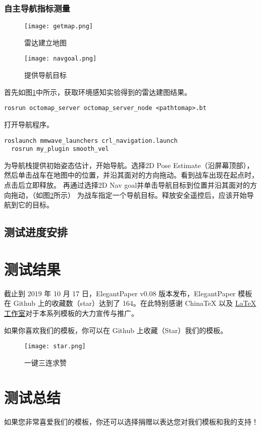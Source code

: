 \documentclass[lang=cn,11pt,a4paper]{elegantpaper}
\begin{document}
\subsubsection{自主导航指标测量}

\begin{figure}[htbp]
  \centering
  \texttt{[image: getmap.png]}
  \caption{雷达建立地图}
  \label{fig:getmap}
\end{figure}
\begin{figure}[htbp]
  \centering
  \texttt{[image: navgoal.png]}
  \caption{提供导航目标}
  \label{fig:goal}
\end{figure}


首先如图\ref{fig:getmap}中所示，获取环境感知实验得到的雷达建图结果。
\begin{lstlisting}[language=ros]
  rosrun octomap_server octomap_server_node <pathtomap>.bt
\end{lstlisting}	
打开导航程序。
\begin{lstlisting}[language=ros]
  roslaunch mmwave_launchers crl_navigation.launch
  rosrun my_plugin smooth_vel
\end{lstlisting}
为导航栈提供初始姿态估计，开始导航。选择2D Pose Estimate（沿屏幕顶部），
然后单击战车在地图中的位置，并沿其面对的方向拖动。看到战车出现在起点时，点击后立即释放。
再通过选择2D Nav goal并单击导航目标到位置并沿其面对的方向拖动，（如图\ref{fig:goal}所示）
为战车指定一个导航目标。释放安全遥控后，应该开始导航到它的目标。


\subsection{测试进度安排}


\section{测试结果}
截止到 2019 年 10 月 17 日，ElegantPaper v0.08 版本发布，ElegantPaper 模板在 Github 上的收藏数（star）达到了 164。在此特别感谢 China\TeX{} 以及 \href{http://www.latexstudio.net/}{\LaTeX{} 工作室}对于本系列模板的大力宣传与推广。

如果你喜欢我们的模板，你可以在 Github 上收藏（Star）我们的模板。
\begin{figure}[htbp]
  \centering
  \texttt{[image: star.png]}
  \caption{一键三连求赞}
\end{figure}

\section{测试总结}
如果您非常喜爱我们的模板，你还可以选择捐赠以表达您对我们模板和我的支持！
\end{document}
